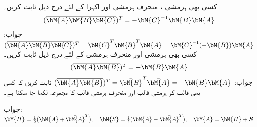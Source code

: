 کسی بھی  ہرمشی ، منحرف ہرمشی  اور اکہرا  کے لئے درج ذیل ثابت کریں۔
\begin{align*}
(\overline{\bM{A}\bM{B}\bM{C}})^T=-\bM{C}^{-1}\bM{B}\bM{A}
\end{align*}
جواب:
$(\overline{\bM{A}\bM{B}\bM{C}})^T=\bar{\bM{C}}^T\bar{\bM{B}}^T\bar{\bM{A}}=\bM{C}^{-1}(-\bM{B})\bM{A}$
کسی بھی  ہرمشی  اور منحرف ہرمشی  کے لئے درج ذیل ثابت کریں۔
\begin{align*}
(\overline{\bM{A}\bM{B}})^T=-\bM{B}\bM{A}
\end{align*}
جواب:
$(\overline{\bM{A}\bM{B}})^T=\bar{\bM{B}}^T\bar{\bM{A}}=-\bM{B}\bM{A}$
ثابت کریں کہ کسی بھی قالب  کو ہرمشی قالب  اور منحرف ہرمشی قالب  کا مجموعہ لکھا جا سکتا ہے۔

جواب:
$\bM{H}=\tfrac{1}{2}(\bM{A}+\bar{\bM{A}}^T),\quad \bM{S}=\tfrac{1}{2}(\bM{A}-\bar{\bM{A}}^T),\quad \bM{A}=\bM{H}+\bm{S}$
